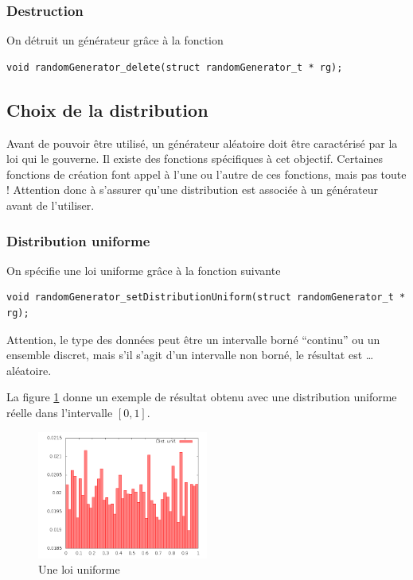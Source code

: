 \subsubsection{Destruction}

   On détruit un générateur grâce à la fonction

\begin{verbatim}
void randomGenerator_delete(struct randomGenerator_t * rg);
\end{verbatim}

%
\subsection{Choix de la distribution}

   Avant de pouvoir être utilisé, un générateur aléatoire doit être
caractérisé par la loi qui le gouverne. Il existe des fonctions
spécifiques à cet objectif. Certaines fonctions de création font appel
à l'une ou l'autre de ces fonctions, mais pas toute ! Attention donc à
s'assurer qu'une distribution est associée à un générateur avant de
l'utiliser.

%
\subsubsection{Distribution uniforme}

   On spécifie une loi uniforme grâce à la fonction suivante

\begin{verbatim}
void randomGenerator_setDistributionUniform(struct randomGenerator_t * rg);
\end{verbatim}

   Attention, le type des données peut être un intervalle borné
``continu'' ou un ensemble discret, mais s'il s'agit d'un intervalle
non borné, le résultat est \ldots {} aléatoire.

   La figure \ref{figure:distuni} donne un exemple de résultat obtenu
avec une distribution uniforme réelle dans l'intervalle $[0, 1]$.

\begin{figure}[h]
\begin{center}
\includegraphics[width=0.5\textwidth]{DistributionUnif.png}
\caption{Une loi uniforme\label{figure:distuni}}
\end{center}
\end{figure}



